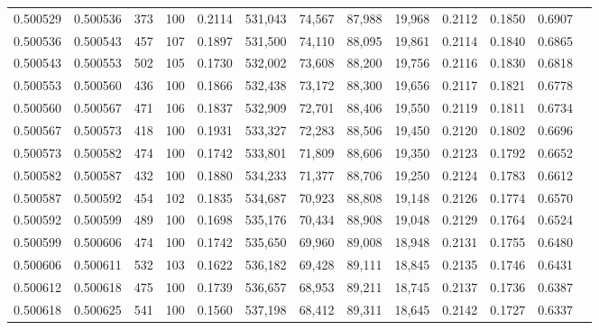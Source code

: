 \begin{tabular}{rrrrrrrrrrrrr}
0.500529 & 0.500536 &   373 & 100 &                                     0.2114 & 531,043 &  74,567 &  87,988 &  19,968 & 0.2112 & 0.1850 & 0.6907 \\
0.500536 & 0.500543 &   457 & 107 &                                     0.1897 & 531,500 &  74,110 &  88,095 &  19,861 & 0.2114 & 0.1840 & 0.6865 \\
0.500543 & 0.500553 &   502 & 105 &                                     0.1730 & 532,002 &  73,608 &  88,200 &  19,756 & 0.2116 & 0.1830 & 0.6818 \\
0.500553 & 0.500560 &   436 & 100 &                                     0.1866 & 532,438 &  73,172 &  88,300 &  19,656 & 0.2117 & 0.1821 & 0.6778 \\
0.500560 & 0.500567 &   471 & 106 &                                     0.1837 & 532,909 &  72,701 &  88,406 &  19,550 & 0.2119 & 0.1811 & 0.6734 \\
0.500567 & 0.500573 &   418 & 100 &                                     0.1931 & 533,327 &  72,283 &  88,506 &  19,450 & 0.2120 & 0.1802 & 0.6696 \\
0.500573 & 0.500582 &   474 & 100 &                                     0.1742 & 533,801 &  71,809 &  88,606 &  19,350 & 0.2123 & 0.1792 & 0.6652 \\
0.500582 & 0.500587 &   432 & 100 &                                     0.1880 & 534,233 &  71,377 &  88,706 &  19,250 & 0.2124 & 0.1783 & 0.6612 \\
0.500587 & 0.500592 &   454 & 102 &                                     0.1835 & 534,687 &  70,923 &  88,808 &  19,148 & 0.2126 & 0.1774 & 0.6570 \\
0.500592 & 0.500599 &   489 & 100 &                                     0.1698 & 535,176 &  70,434 &  88,908 &  19,048 & 0.2129 & 0.1764 & 0.6524 \\
0.500599 & 0.500606 &   474 & 100 &                                     0.1742 & 535,650 &  69,960 &  89,008 &  18,948 & 0.2131 & 0.1755 & 0.6480 \\
0.500606 & 0.500611 &   532 & 103 &                                     0.1622 & 536,182 &  69,428 &  89,111 &  18,845 & 0.2135 & 0.1746 & 0.6431 \\
0.500612 & 0.500618 &   475 & 100 &                                     0.1739 & 536,657 &  68,953 &  89,211 &  18,745 & 0.2137 & 0.1736 & 0.6387 \\
0.500618 & 0.500625 &   541 & 100 &                                     0.1560 & 537,198 &  68,412 &  89,311 &  18,645 & 0.2142 & 0.1727 & 0.6337 \\

\end{tabular}
